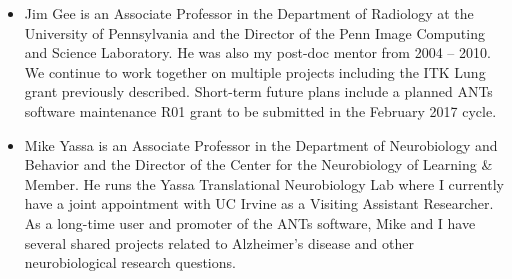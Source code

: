 \documentclass[11pt,]{article}
\begin{document}
\begin{itemize}
\item
  Jim Gee is an Associate Professor in the Department of Radiology at
  the University of Pennsylvania and the Director of the Penn Image
  Computing and Science Laboratory. He was also my post-doc mentor from
  2004 -- 2010. We continue to work together on multiple projects
  including the ITK Lung grant previously described. Short-term future
  plans include a planned ANTs software maintenance R01 grant to be
  submitted in the February 2017 cycle.
\item
  Mike Yassa is an Associate Professor in the Department of Neurobiology
  and Behavior and the Director of the Center for the Neurobiology of
  Learning \& Member. He runs the Yassa Translational Neurobiology Lab
  where I currently have a joint appointment with UC Irvine as a
  Visiting Assistant Researcher. As a long-time user and promoter of the
  ANTs software, Mike and I have several shared projects related to
  Alzheimer's disease and other neurobiological research questions.
\end{itemize}
\end{document}
